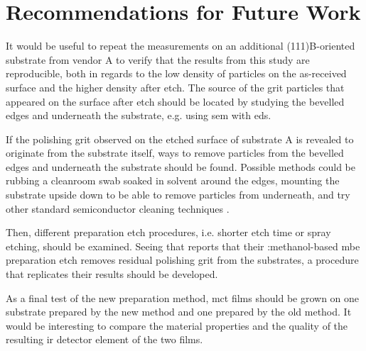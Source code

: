 \chapter{Recommendations for Future Work}\label{ch:further-work}
%

It would be useful to repeat the measurements on an additional (111)B-oriented substrate from vendor A to verify that the results from this study are reproducible, both in regards to the low density of particles on the as-received surface and the higher density after etch. The source of the grit particles that appeared on the surface after etch should be located by studying the bevelled edges and underneath the substrate, e.g. using \ac{sem} with \ac{eds}.

If the polishing grit observed on the etched surface of substrate A is revealed to originate from the substrate itself, ways to remove particles from the bevelled edges and underneath the substrate should be found. Possible methods could be rubbing a cleanroom swab soaked in solvent around the edges, mounting the substrate upside down to be able to remove particles from underneath, and try other standard semiconductor cleaning techniques \citep{reinhardt2008handbook}.

Then, different preparation etch procedures, i.e. shorter etch time or spray etching, should be examined. Seeing that \citet{benson2016analysis} reports that their :methanol-based \ac{mbe} preparation etch removes residual  polishing grit from the substrates, a procedure that replicates their results should be developed.

As a final test of the new preparation method, \ac{mct} films should be grown on one substrate prepared by the new method and one prepared by the old method. It would be interesting to compare the material properties and the quality of the resulting \ac{ir} detector element of the two films.


